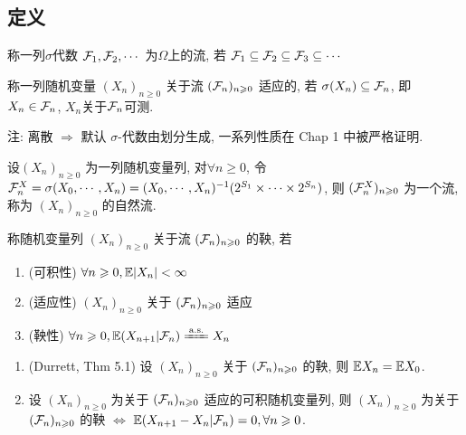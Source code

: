 \subsection{定义}

\begin{definition}[流]
    称一列$\sigma$代数 $\mathcal{F}_1,\mathcal{F}_2,\cdots$ 为$\Omega$上的流, 若 $\mathcal{F}_1\subseteq \mathcal{F}_2\subseteq \mathcal{F}_3\subseteq\cdots$
\end{definition}

\begin{definition}[适应过程]
    称一列随机变量 $(X_n)_{n\geq 0}$ 关于流 $(\mathcal{F}_n)_{n\geqslant 0}$ 适应的, 若 $\sigma(X_n)\subseteq \mathcal{F}_n$, 即 $X_n\in \mathcal{F}_n$, $X_n$关于$\mathcal{F}_n$可测.
\end{definition}
注: 离散 $\Rightarrow$ 默认 $\sigma$-代数由划分生成, 一系列性质在 Chap 1 中被严格证明.

\begin{example}
    设$(X_n)_{n\geq 0}$ 为一列随机变量列, 对$\forall n\geq 0$, 令 $\mathcal{F}_n^X=\sigma(X_0,\cdots,X_n)=(X_0,\cdots,X_n)^{-1}(2^{S_1}\times\cdots\times 2^{S_n})$, 则 $(\mathcal{F}_n^X)_{n\geqslant 0}$ 为一个流, 称为 $(X_n)_{n\geq 0}$ 的自然流.
\end{example}

\begin{definition}[离散鞅]\label{def:p140-def3}
    称随机变量列 $(X_n)_{n\geq 0}$ 关于流 $(\mathcal{F}_n)_{n\geqslant 0}$ 的鞅, 若
    \begin{enumerate}
        \item (可积性) $\forall n\geqslant 0, \mathbb E|X_n|<\infty$
        \item (适应性) $(X_n)_{n\geq 0}$ 关于 $(\mathcal{F}_n)_{n\geqslant 0}$ 适应
        \item (鞅性) $\forall n\geq 0, \EE(X_{n+1}|\CF_n)\xlongequal{\text{a.s.}}X_n$
    \end{enumerate}
\end{definition}

\begin{theorem}
    \begin{enumerate}
        \item (Durrett, Thm 5.1) 设 $(X_n)_{n\geq 0}$ 关于 $(\mathcal{F}_n)_{n\geqslant 0}$ 的鞅, 则 $\mathbb E X_n=\mathbb E X_0$.
        \item 设 $(X_n)_{n\geq 0}$ 为关于 $(\mathcal{F}_n)_{n\geqslant 0}$ 适应的可积随机变量列, 则 $(X_n)_{n\geq 0}$ 为关于 $(\mathcal{F}_n)_{n\geqslant 0}$ 的鞅 $\iff$ $\mathbb E(X_{n+1}-X_n|\mathcal{F}_n)=0,\forall n\geqslant 0$.
    \end{enumerate}
\end{theorem}

